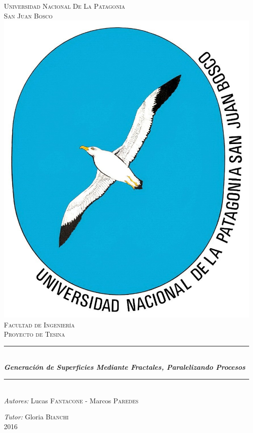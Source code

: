 \documentclass[12pt]{article} %
\begin{document}

\begin{titlepage}

\newcommand{\HRule}{\rule{\linewidth}{0.5mm}} %

\center %

\textsc{\LARGE Universidad Nacional De La Patagonia}\\[0.2cm] %
\textsc{\LARGE San Juan Bosco}\\[0.2cm] 

\includegraphics[width=0.4\linewidth]{logo.jpg}\\[0.2cm]

\textsc{\Large Facultad de Ingeniería}\\[0.5cm] %
\textsc{\large Proyecto de Tesina}\\ %


\HRule \\[0.5cm]
\huge \textsl{\textbf{Generación de Superficies Mediante Fractales, Paralelizando Procesos}}\\
\HRule \\[1.2cm]

\large
\emph{Autores:} Lucas \textsc{Fantacone} - Marcos \textsc{Paredes} %

\emph{Tutor:} Gloria \textsc{Bianchi} %
\\[0.5cm]

{\Large 2016} %

\vfill %

\end{titlepage}
\end{document}
